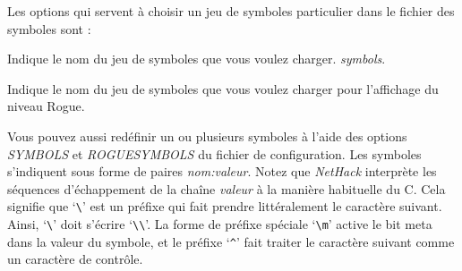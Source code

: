 \documentclass[titlepage]{article}
\begin{document}
Les options qui servent à choisir un jeu de symboles particulier dans le
fichier des symboles sont :

\begin{description}[font=\mdseries\itshape]
\item[symset]
Indique le nom du jeu de symboles que vous voulez charger.
\textit{symbols}.

\item[roguesymset]
Indique le nom du jeu de symboles que vous voulez charger pour l'affichage
du niveau Rogue.
\end{description}

Vous pouvez aussi redéfinir un ou plusieurs symboles à l'aide des options
\textit{SYMBOLS} et \textit{ROGUESYMBOLS} du fichier de configuration.
Les symboles s'indiquent sous forme de paires \textit{nom:valeur}.
Notez que \textit{NetHack} interprète les séquences d'échappement de
la chaîne \textit{valeur} à la manière habituelle du C.
Cela signifie que `\texttt{\textbackslash}' est un préfixe qui fait prendre littéralement
le caractère suivant.
Ainsi, `\texttt{\textbackslash}' doit s'écrire `\texttt{\textbackslash\textbackslash}'.
La forme de préfixe spéciale
`\texttt{\textbackslash m}' active le bit meta dans la valeur du symbole, et le
préfixe `\texttt{\textasciicircum}' fait traiter le caractère suivant comme un caractère
de contrôle.
\end{document}
